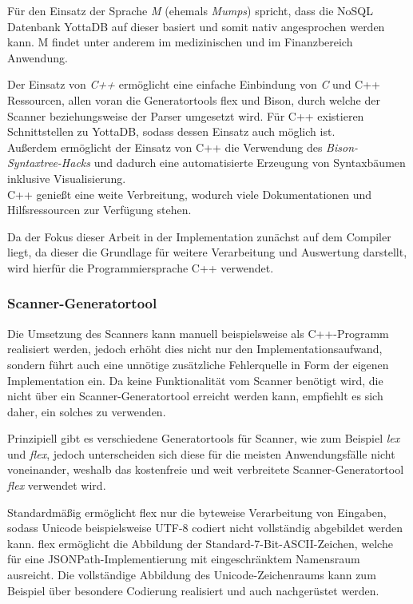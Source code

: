 \documentclass[oneside]{ausarbeitung}
\begin{document}
Für den Einsatz der Sprache \textit{M} (ehemals \textit{Mumps}) spricht, dass die NoSQL Datenbank YottaDB auf dieser basiert und somit nativ angesprochen werden kann. M findet unter anderem im medizinischen und im Finanzbereich Anwendung. 

Der Einsatz von \textit{C++} ermöglicht eine einfache Einbindung von \textit{C} und C++ Ressourcen, allen voran die Generatortools flex und Bison, durch welche der Scanner beziehungsweise der Parser umgesetzt wird. Für C++ existieren Schnittstellen zu YottaDB, sodass dessen Einsatz auch möglich ist.  \\Außerdem ermöglicht der Einsatz von C++ die Verwendung des \textit{Bison-Syntaxtree-Hacks} \cite{Bantel:bisonhack} und dadurch eine automatisierte Erzeugung von Syntaxbäumen inklusive Visualisierung. \\
C++ genießt eine weite Verbreitung, wodurch viele Dokumentationen und Hilfsressourcen zur Verfügung stehen. 

Da der Fokus dieser Arbeit in der Implementation zunächst auf dem Compiler liegt, da dieser die Grundlage für weitere Verarbeitung und Auswertung darstellt, wird hierfür die Programmiersprache C++ verwendet. 



\subsubsection{Scanner-Generatortool}

Die Umsetzung des Scanners kann manuell beispielsweise als C++-Programm realisiert werden, jedoch erhöht dies nicht nur den Implementationsaufwand, sondern führt auch eine unnötige zusätzliche Fehlerquelle in Form der eigenen Implementation ein. Da keine Funktionalität vom Scanner benötigt wird, die nicht über ein Scanner-Generatortool erreicht werden kann, empfiehlt es sich daher, ein solches zu verwenden.

Prinzipiell gibt es verschiedene Generatortools für Scanner, wie zum Beispiel \textit{lex} und \textit{flex}, jedoch unterscheiden sich diese für die meisten Anwendungsfälle nicht voneinander, weshalb das kostenfreie und weit verbreitete Scanner-Generatortool \textit{flex} verwendet wird.

Standardmäßig ermöglicht flex nur die byteweise Verarbeitung von Eingaben, sodass Unicode beispielsweise UTF-8 codiert nicht vollständig abgebildet werden kann. flex ermöglicht die Abbildung der Standard-7-Bit-ASCII-Zeichen, welche für eine JSONPath-Implementierung mit eingeschränktem Namensraum ausreicht. Die vollständige Abbildung des Unicode-Zeichenraums kann zum Beispiel über besondere Codierung realisiert und auch nachgerüstet werden.
\end{document}
